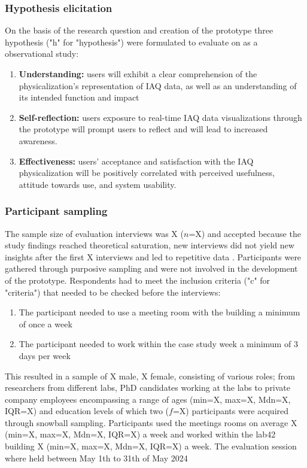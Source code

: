 \subsubsection{Hypothesis elicitation}

On the basis of the research question and creation of the prototype three hypothesis ("h" for "hypothesis") were formulated to evaluate on as a observational study:

\begin{enumerate}
    \renewcommand{\labelenumi}{H\arabic{enumi}:}
    \item \textbf{Understanding:} users will exhibit a clear comprehension of the physicalization's representation of IAQ data, as well as an understanding of its intended function and impact
    \item \textbf{Self-reflection:} users exposure to real-time IAQ data visualizations through the prototype will prompt users to reflect and will lead to increased awareness.
    \item \textbf{Effectiveness:} users' acceptance and satisfaction with the IAQ physicalization will be positively correlated with perceived usefulness, attitude towards use, and system usability.
\end{enumerate}

\subsubsection{Participant sampling}

The sample size of evaluation interviews was X ($n$=X) and accepted because the study findings reached theoretical saturation, new interviews did not yield new insights after the first X interviews and led to repetitive data \cite{steph_menken_introduction_2016}. Participants were gathered through purposive sampling and were not involved in the development of the prototype. Respondents had to meet the inclusion criteria ("c" for "criteria") that needed to be checked before the interviews: 

\begin{enumerate}
    \renewcommand{\labelenumi}{C\arabic{enumi}:}
    \item The participant needed to use a meeting room with the building a minimum of once a week
    \item The participant needed to work within the case study week a minimum of 3 days per week
\end{enumerate}

This resulted in a sample of X male, X female, consisting of various roles; from researchers from different labs, PhD candidates working at the labs to private company employees encompassing a range of ages (min=X, max=X, Mdn=X, IQR=X) and education levels of which two ($f$=X) participants were acquired through snowball sampling. Participants used the meetings rooms on average X (min=X, max=X, Mdn=X, IQR=X) a week and worked within the lab42 building X (min=X, max=X, Mdn=X, IQR=X) a week. The evaluation session where held between May 1th to 31th of May 2024


